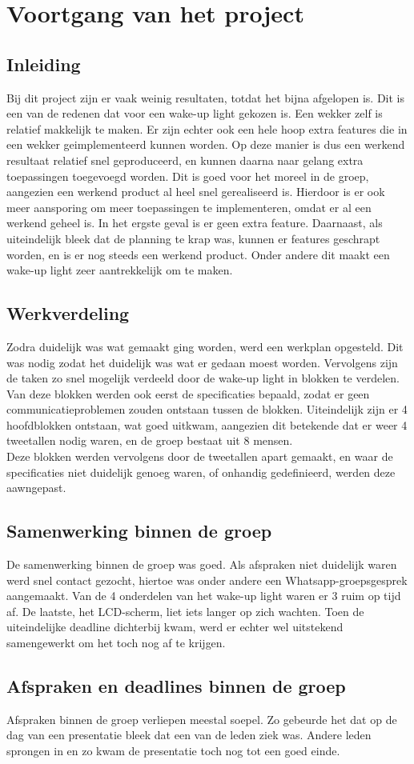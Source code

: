 \chapter{Voortgang van het project}

\section{Inleiding}
Bij dit project zijn er vaak weinig resultaten, totdat het bijna afgelopen is. 
Dit is een van de redenen dat voor een wake-up light gekozen is.
Een wekker zelf is relatief makkelijk te maken. 
Er zijn echter ook een hele hoop extra features die in een wekker geimplementeerd kunnen worden. 
Op deze manier is dus een werkend resultaat relatief snel geproduceerd, en kunnen daarna naar gelang extra toepassingen toegevoegd worden. 
Dit is goed voor het moreel in de groep, aangezien een werkend product al heel snel gerealiseerd is.
Hierdoor is er ook meer aansporing om meer toepassingen te implementeren, omdat er al een werkend geheel is. 
In het ergste geval is er geen extra feature.
Daarnaast, als uiteindelijk bleek dat de planning te krap was, kunnen er features geschrapt worden, en is er nog steeds een werkend product. 
Onder andere dit maakt een wake-up light zeer aantrekkelijk om te maken.

\section{Werkverdeling}
Zodra duidelijk was wat gemaakt ging worden, werd een werkplan opgesteld.
Dit was nodig zodat het duidelijk was wat er gedaan moest worden.
Vervolgens zijn de taken zo snel mogelijk verdeeld door de wake-up light in blokken te verdelen. 
Van deze blokken werden ook eerst de specificaties bepaald, zodat er geen communicatieproblemen zouden ontstaan tussen de blokken.
Uiteindelijk zijn er 4 hoofdblokken ontstaan, wat goed uitkwam, aangezien dit betekende dat er weer 4 tweetallen nodig waren, en de groep bestaat uit 8 mensen. \\
Deze blokken werden vervolgens door de tweetallen apart gemaakt, en waar de specificaties niet duidelijk genoeg waren, of onhandig gedefinieerd, werden deze aawngepast. 


\section{Samenwerking binnen de groep}
De samenwerking binnen de groep was goed. Als afspraken niet duidelijk waren werd snel contact gezocht, hiertoe was onder andere een Whatsapp-groepsgesprek aangemaakt. Van de 4 onderdelen van het wake-up light waren er 3 ruim op tijd af. De laatste, het LCD-scherm, liet iets langer op zich wachten. Toen de uiteindelijke deadline dichterbij kwam, werd er echter wel uitstekend samengewerkt om het toch nog af te krijgen.


\section{Afspraken en deadlines binnen de groep}
Afspraken binnen de groep verliepen meestal soepel. Zo gebeurde het dat op de dag van een presentatie bleek dat een van de leden ziek was. Andere leden sprongen in en zo kwam de presentatie toch nog tot een goed einde. 